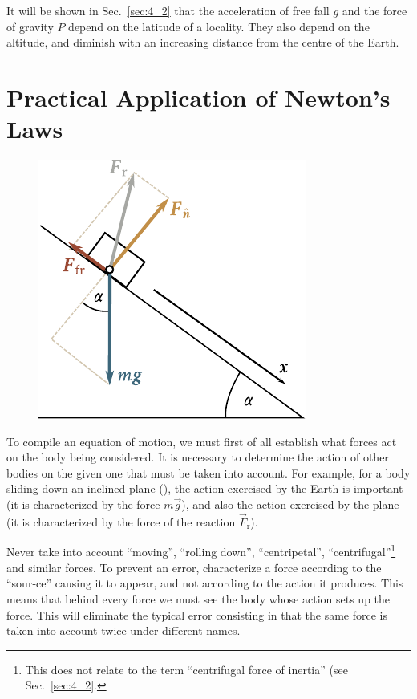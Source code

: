 It will be shown in Sec.~\ref{sec:4_2} that the acceleration of free fall $g$ and the force of gravity $P$ depend on the latitude of a locality. They also depend on the altitude, and diminish with an increasing distance from the centre of the Earth.

\section{Practical Application of Newton's Laws}\label{sec:2_12}

\begin{figure}[t]
	\begin{center}
		\includegraphics[scale=1]{figures/ch_02/fig_2_12.pdf}
		\caption[]{}
		\label{fig:2_12}
	\end{center}
	\vspace{-0.7cm}
\end{figure}

To compile an equation of motion, we must first of all establish what forces act on the body being considered. It is necessary to determine the action of other bodies on the given one that must be taken into account. For example, for a body sliding down an inclined plane (), the action exercised by the Earth is important (it is characterized by the force $m\vec{g}$), and also the action exercised by the plane (it is characterized by the force of the reaction $\vec{F}_{\text{r}}$).

Never take into account ``moving'', ``rolling down'', ``centripetal'', ``centrifugal''\footnote{This does not relate to the term ``centrifugal force of inertia'' (see Sec.~\ref{sec:4_2}.} and similar forces. To prevent an error, characterize a force according to the ``sour-ce'' causing it to appear, and not according to the action it produces. This means that behind every force we must see the body whose action sets up the force. This will eliminate the typical error consisting in that the same force is taken into account twice under different names.

